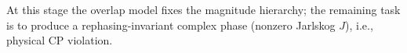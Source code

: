 At this stage the overlap model fixes the magnitude hierarchy; the remaining
task is to produce a rephasing-invariant complex phase (nonzero Jarlskog $J$),
i.e., physical CP violation.





